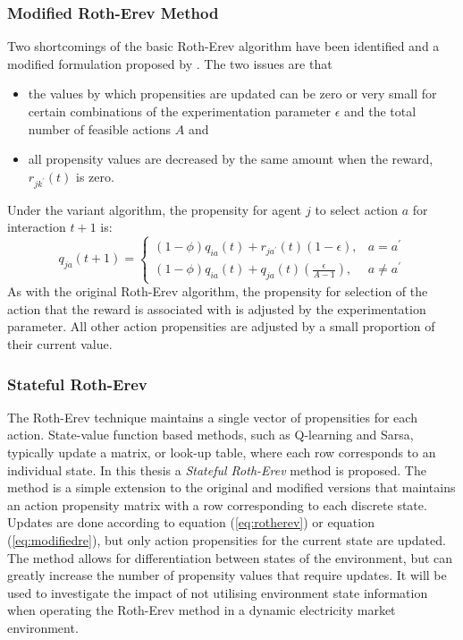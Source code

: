 \subsubsection{Modified Roth-Erev Method}
\label{sec:variant}
Two shortcomings of the basic Roth-Erev algorithm have been identified and a
modified formulation proposed by .  The two issues are
that
\begin{itemize}
  \item the values by which propensities are updated can be zero or very small
  for certain combinations of the experimentation parameter $\epsilon$ and
  the total number of feasible actions $A$ and
  \item all propensity values are decreased by the same amount when the reward,
  $r_{jk^\prime}(t)$ is zero.
\end{itemize}
Under the variant algorithm, the propensity for agent $j$ to select action $a$
for interaction $t+1$ is:
\begin{equation}
\label{eq:modifiedre}
q_{ja}(t+1) =
\begin{cases}
(1-\phi)q_{ia}(t) + r_{ja^\prime}(t)(1-\epsilon), & \text{$a = a^\prime$} \\
(1-\phi)q_{ia}(t) + q_{ja}(t)(\frac{\epsilon}{A-1}), & \text{$a \ne
a^\prime$}
\end{cases}
\end{equation}
As with the original Roth-Erev algorithm, the propensity for selection of the
action that the reward is associated with is adjusted by the experimentation
parameter.  All other action propensities are adjusted by a small proportion of
their current value.

\subsubsection{Stateful Roth-Erev}
\label{sec:stateful}
The Roth-Erev technique maintains a single vector of propensities for each
action.  State-value function based methods, such as Q-learning and Sarsa,
typically update a matrix, or look-up table, where each row corresponds to an
individual state.  In this thesis a \textit{Stateful Roth-Erev} method is
proposed.  The method is a simple extension to the original and modified
versions that maintains an action propensity matrix with a row corresponding to
each discrete state.  Updates are done according to equation (\ref{eq:rotherev})
or equation (\ref{eq:modifiedre}), but only action propensities for the current
state are updated. The method allows for differentiation between states of the
environment, but can greatly increase the number of propensity values that
require updates.  It will be used to investigate the impact of not utilising
environment state information when operating the Roth-Erev method
in a dynamic electricity market environment.

